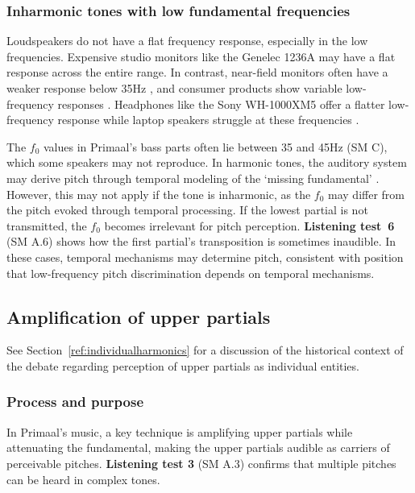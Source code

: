 \documentclass{article}
\begin{document}
\subsubsection{Inharmonic tones with low fundamental frequencies}\label{sec:lowinharmonic}



Loudspeakers do not have a flat frequency response, especially in the low frequencies. Expensive studio monitors like the Genelec 1236A \citep{Genelec2024} may have a flat response across the entire range. In contrast, near-field monitors often have a weaker response below 35Hz \citep{newell2001yamaha,deruty2024storch}, and consumer products show variable low-frequency responses \citep{Rtings2024}. Headphones like the Sony WH-1000XM5 offer a flatter low-frequency response \citep{Taboada2022} while laptop speakers struggle at these frequencies \citep{Dave2D2022}.

The $f_0$ values in Primaal's bass parts often lie between 35 and 45Hz (SM C), which some speakers may not reproduce. In harmonic tones, the auditory system may derive pitch through temporal modeling of the `missing fundamental' \citep{fletcher1924physical}. However, this may not apply if the tone is inharmonic, as the $f_0$ may differ from the pitch evoked through temporal processing. If the lowest partial is not transmitted, the $f_0$ becomes irrelevant for pitch perception. \textbf{Listening test~6} (SM A.6) shows how the first partial's transposition is sometimes inaudible. In these cases, temporal mechanisms may determine pitch, consistent with  position that low-frequency pitch discrimination depends on temporal mechanisms.




\subsection{Amplification of upper partials}\label{sec:loudharmonics}

See Section~\ref{ref:individualharmonics} for a discussion of the historical context of the debate regarding perception of upper partials as individual entities. 

\subsubsection{Process and purpose}\label{sec:partialamplificationprocess}




In Primaal's music, a key technique is amplifying upper partials while attenuating the fundamental, making the upper partials audible as carriers of perceivable pitches. \textbf{Listening test 3} (SM A.3) confirms that multiple pitches can be heard in complex tones.
\end{document}
